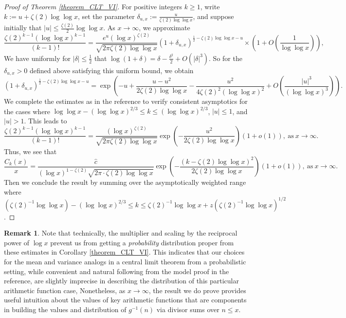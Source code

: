 \documentclass[11pt,reqno,a4letter]{article}
\numberwithin{figure}{section}
\numberwithin{table}{section}
\theoremstyle{plain}
\numberwithin{theorem}{section}
\theoremstyle{definition}
\newtheorem{remark}[theorem]{Remark}
\begin{document}
\begin{proof}[Proof of Theorem \ref{theorem_CLT_VI}]
For positive integers $k \geq 1$, write $k := u + \zeta(2) \log\log x$, set the parameter 
$\delta_{u,x} := \frac{u}{\zeta(2) \log\log x}$, and suppose initially that 
$|u| \leq \frac{\zeta(2)}{2} \log\log x$. As $x \rightarrow \infty$, we approximate 
\[
\frac{\zeta(2)^{k-1} (\log\log x)^{k-1}}{(k-1)!} = \frac{e^u (\log x)^{\zeta(2)}}{ 
     \sqrt{2\pi \zeta(2) \log\log x}} (1 + \delta_{u,x})^{\frac{1}{2} - \zeta(2) \log\log x - u} 
     \times \left(1 + O\left(\frac{1}{\log\log x}\right)\right), 
\]
We have uniformly for $|\delta| \leq \frac{1}{2}$ that 
$\log(1 + \delta) = \delta - \frac{\delta^2}{2} + O(|\delta|^3)$. So for the 
$\delta_{u,x} > 0$ defined above satisfying this uniform bound, we obtain 
\[
(1 + \delta_{u,x})^{\frac{1}{2} - \zeta(2) \log\log x - u} = \exp\left( 
     -u + \frac{u-u^2}{2\zeta(2) \log\log x} - 
     \frac{u^2}{4 \zeta(2)^2 (\log\log x)^2} + 
     O\left(\frac{|u|^3}{(\log\log x)^3}\right)\right). 
\]
We complete the estimates as in the reference to verify consistent asymptotics 
for the cases where $\log\log x - (\log\log x)^{2/3} \leq k \leq (\log\log x)^{2/3}$, 
$|u| \leq 1$, and $|u| > 1$. This leads to 
\[
\frac{\zeta(2)^{k-1} (\log\log x)^{k-1}}{(k-1)!} = \frac{(\log x)^{\zeta(2)}}{ 
     \sqrt{2\pi \zeta(2) \log\log x}} \exp\left(-\frac{u^2}{2 \zeta(2) \log\log x}\right) \left( 
     1 + o(1)\right), \mathrm{\ as\ } x \rightarrow \infty. 
\]
Thus, we see that 
\[
\frac{\widehat{C}_k(x)}{x} = \frac{\widehat{c}}{(\log x)^{1-\zeta(2)} 
     \sqrt{2\pi \cdot \zeta(2) \log\log x}} 
     \exp\left(-\frac{(k - \zeta(2) \log\log x)^2}{ 
     2\zeta(2) \log\log x}\right) (1 + o(1)), 
     \mathrm{\ as\ } x \rightarrow \infty. 
\]
Then we conclude the result by summing over the asymptotically weighted range where 
$\left(\zeta(2)^{-1} \log\log x\right) - (\log\log x)^{2/3} \leq k \leq 
 \zeta(2)^{-1} \log\log x + z \left(\zeta(2)^{-1} \log\log x\right)^{1/2}$. 
\end{proof} 

\begin{remark} 
Note that technically, the multiplier and scaling by the reciprocal power of 
$\log x$ prevent us from getting a \emph{probability} distribution proper 
from these estimates in 
Corollary \ref{theorem_CLT_VI}. This indicates that our choices for the 
mean and variance analogs in a central limit theorem from a probabilistic setting, 
while convenient and natural following from the model proof in the reference, 
are slightly imprecise in describing the distribution of this particular 
arithmetic function case, Nonetheless, as $ x\rightarrow \infty$, the result we do 
prove provides useful intuition about the values of key arithmetic functions 
that are components in building the values and distribution of $g^{-1}(n)$ via 
divisor sums over $n \leq x$. 
\end{remark} 
\end{document}
